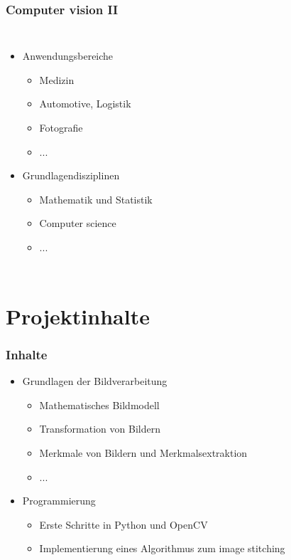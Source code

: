 \documentclass[aspectratio=43, 11pt]{beamer}
\begin{document}
		\begin{frame}
			\frametitle{Computer vision II}
			\begin{columns}
			  	\begin{itemize}
						\item Anwendungsbereiche
							\begin{itemize}
								\item Medizin
								\item Automotive, Logistik
								\item Fotografie
								\item ...
							\end{itemize}
						\item Grundlagendisziplinen
							\begin{itemize}
								\item Mathematik und Statistik
								\item Computer science
								\item ...
							\end{itemize}
					\end{itemize}
			\end{columns}
			
		\end{frame}

  \section{Projektinhalte}

    \begin{frame}
      \frametitle{Inhalte}

      \begin{itemize}
        \item Grundlagen der Bildverarbeitung
          \begin{itemize}
            \item Mathematisches Bildmodell
            \item Transformation von Bildern
            \item Merkmale von Bildern und Merkmalsextraktion
            \item ...
          \end{itemize}
        \item Programmierung
          \begin{itemize}
            \item Erste Schritte in Python und OpenCV
            \item Implementierung eines Algorithmus zum image stitching
          \end{itemize}
      \end{itemize}

    \end{frame}
\end{document}
